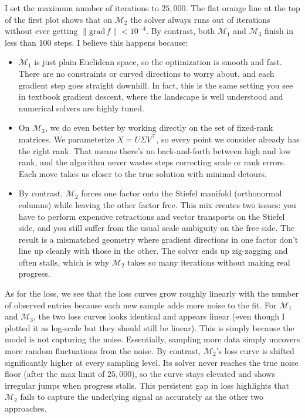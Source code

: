 \documentclass[11pt]{scrartcl}
\begin{document}
I set the maximum number of iterations to \(25{,}000\). The flat orange line at the top of the first plot shows that on \(\mathcal{M}_2\) the solver always runs out of iterations without ever getting \(\|\mathrm{grad}\,f\|<10^{-4}\). By contrast, both \(\mathcal{M}_1\) and \(\mathcal{M}_3\) finish in less than 100 steps. I believe this happens because: \begin{itemize}
    \item \(\mathcal{M}_1\) is just plain Euclidean space, so the optimization is smooth and fast. There are no constraints or curved directions to worry about, and each gradient step goes straight downhill. In fact, this is the same setting you see in textbook gradient descent, where the landscape is well understood and numerical solvers are highly tuned. 
    \item On \(\mathcal{M}_3\), we do even better by working directly on the set of fixed-rank matrices. We parameterize \(X=U\Sigma V^\top\), so every point we consider already has the right rank. That means there's no back-and-forth between high and low rank, and the algorithm never wastes steps correcting scale or rank errors. Each move takes us closer to the true solution with minimal detours.
    \item By contrast, \(\mathcal{M}_2\) forces one factor onto the Stiefel manifold (orthonormal columns) while leaving the other factor free. This mix creates two issues: you have to perform expensive retractions and vector transports on the Stiefel side, and you still suffer from the usual scale ambiguity on the free side. The result is a mismatched geometry where gradient directions in one factor don't line up cleanly with those in the other. The solver ends up zig-zagging and often stalls, which is why \(\mathcal{M}_2\) takes so many iterations without making real progress.
\end{itemize}

As for the loss, we see that the loss curves grow roughly linearly with the number of observed entries because each new sample adds more noise to the fit. For \(\mathcal{M}_1\) and \(\mathcal{M}_3\), the two loss curves looks identical and appears linear (even though I plotted it as log-scale but they should still be linear). This is simply because the model is not capturing the noise. Essentially, sampling more data simply uncovers more random fluctuations from the noise. By contrast, \(\mathcal{M}_2\)'s loss curve is shifted significantly higher at every sampling level. Its solver never reaches the true noise floor (after the max limit of $25,000$), so the curve stays elevated and shows irregular jumps when progress stalls. This persistent gap in loss highlights that \(\mathcal{M}_2\) fails to capture the underlying signal as accurately as the other two approaches.
\end{document}
